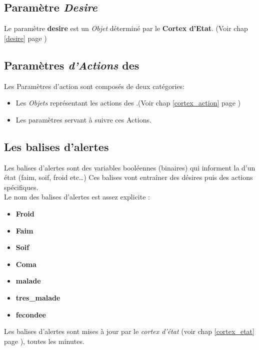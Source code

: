 \documentclass[french]{report}
\begin{document}
\subsection{Paramètre \textit{Desire}}
Le paramètre \textbf{desire} est un \textit{Objet} déterminé par le \textbf{Cortex d'Etat}. (Voir chap \ref{desire} page \pageref{desire})

\newpage

\subsection{Paramètres \textit{d'Actions} des  \CoCiX}\label{param_action}
Les Paramètres d'action sont composés de deux catégories:
\begin{itemize}
	\item Les \textit{Objets} représentant les actions des \CoCiX.(Voir chap \ref{cortex_action} page \pageref{cortex_action})\\
	\item Les paramètres servant à suivre ces Actions.
\end{itemize}


\subsection{Les balises d'alertes}\label{balise}
Les balises d'alertes sont des variables booléennes (binaires) qui informent la \CoCiX d'un état (faim, soif, froid etc\dots) Ces balises vont entraîner des désires puis des actions spécifiques.\\

Le nom des balises d'alertes est assez explicite : 

\begin{itemize}
	\item \textbf{Froid}
	\item \textbf{Faim}
	\item \textbf{Soif}
	\item \textbf{Coma}
	\item \textbf{malade}
	\item \textbf{tres\_malade}
	\item \textbf{fecondee} \\
\end{itemize}

Les balises d'alertes sont mises à jour par le \textit{cortex d'état} (voir chap \ref{cortex_etat} page \pageref{cortex_etat}), toutes les minutes.\\
\end{document}
